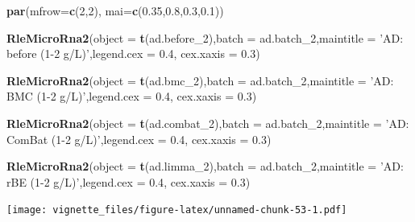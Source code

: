 \documentclass[]{book}
\newenvironment{Shaded}{\begin{snugshade}}{\end{snugshade}}
\newcommand{\KeywordTok}[1]{\textcolor[rgb]{0.13,0.29,0.53}{\textbf{#1}}}
\newcommand{\DataTypeTok}[1]{\textcolor[rgb]{0.13,0.29,0.53}{#1}}
\newcommand{\DecValTok}[1]{\textcolor[rgb]{0.00,0.00,0.81}{#1}}
\newcommand{\FloatTok}[1]{\textcolor[rgb]{0.00,0.00,0.81}{#1}}
\newcommand{\StringTok}[1]{\textcolor[rgb]{0.31,0.60,0.02}{#1}}
\newcommand{\NormalTok}[1]{#1}
\begin{document}
\begin{Shaded}
\begin{Highlighting}[]
\KeywordTok{par}\NormalTok{(}\DataTypeTok{mfrow=}\KeywordTok{c}\NormalTok{(}\DecValTok{2}\NormalTok{,}\DecValTok{2}\NormalTok{), }\DataTypeTok{mai=}\KeywordTok{c}\NormalTok{(}\FloatTok{0.35}\NormalTok{,}\FloatTok{0.8}\NormalTok{,}\FloatTok{0.3}\NormalTok{,}\FloatTok{0.1}\NormalTok{))}

\KeywordTok{RleMicroRna2}\NormalTok{(}\DataTypeTok{object =} \KeywordTok{t}\NormalTok{(ad.before_}\DecValTok{2}\NormalTok{),}\DataTypeTok{batch =}\NormalTok{ ad.batch_}\DecValTok{2}\NormalTok{,}\DataTypeTok{maintitle =} \StringTok{'AD: before (1-2 g/L)'}\NormalTok{,}\DataTypeTok{legend.cex =} \FloatTok{0.4}\NormalTok{, }\DataTypeTok{cex.xaxis =} \FloatTok{0.3}\NormalTok{)}

\KeywordTok{RleMicroRna2}\NormalTok{(}\DataTypeTok{object =} \KeywordTok{t}\NormalTok{(ad.bmc_}\DecValTok{2}\NormalTok{),}\DataTypeTok{batch =}\NormalTok{ ad.batch_}\DecValTok{2}\NormalTok{,}\DataTypeTok{maintitle =} \StringTok{'AD: BMC (1-2 g/L)'}\NormalTok{,}\DataTypeTok{legend.cex =} \FloatTok{0.4}\NormalTok{, }\DataTypeTok{cex.xaxis =} \FloatTok{0.3}\NormalTok{)}

\KeywordTok{RleMicroRna2}\NormalTok{(}\DataTypeTok{object =} \KeywordTok{t}\NormalTok{(ad.combat_}\DecValTok{2}\NormalTok{),}\DataTypeTok{batch =}\NormalTok{ ad.batch_}\DecValTok{2}\NormalTok{,}\DataTypeTok{maintitle =} \StringTok{'AD: ComBat (1-2 g/L)'}\NormalTok{,}\DataTypeTok{legend.cex =} \FloatTok{0.4}\NormalTok{, }\DataTypeTok{cex.xaxis =} \FloatTok{0.3}\NormalTok{)}

\KeywordTok{RleMicroRna2}\NormalTok{(}\DataTypeTok{object =} \KeywordTok{t}\NormalTok{(ad.limma_}\DecValTok{2}\NormalTok{),}\DataTypeTok{batch =}\NormalTok{ ad.batch_}\DecValTok{2}\NormalTok{,}\DataTypeTok{maintitle =} \StringTok{'AD: rBE (1-2 g/L)'}\NormalTok{,}\DataTypeTok{legend.cex =} \FloatTok{0.4}\NormalTok{, }\DataTypeTok{cex.xaxis =} \FloatTok{0.3}\NormalTok{)}
\end{Highlighting}
\end{Shaded}

\texttt{[image: vignette\_files/figure-latex/unnamed-chunk-53-1.pdf]}
\end{document}
